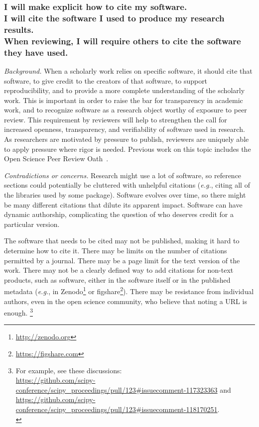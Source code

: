 \documentclass[a4paper,UKenglish]{dagman}
\renewcommand{\paragraph}[1]{\subsubsection*{#1}\xspace}
\newcommand{\eg}{\emph{e.g.},\xspace}
\begin{document}
\paragraph{I will make explicit how to cite my software.\\
I will cite the software I used to produce my research results.\\
When reviewing, I will require others to cite the software they have used.}

\emph{Background.} When a scholarly work relies on specific software, it should cite that software, to give credit to the creators of that software, to support reproducibility, and to provide a more complete understanding of the scholarly work.
This is important in order to raise the bar for transparency in academic work, and to recognize software as a research object worthy of exposure to peer review. This requirement by reviewers will help to strengthen the call for increased openness, transparency, and verifiability of software used in research. As researchers are motivated by pressure to publish, reviewers are uniquely able to apply pressure where rigor is needed. Previous work on this topic includes the Open Science Peer Review Oath~\cite{aleksic_open_2015}.

\emph{Contradictions or concerns.}
Research might use a lot of software, so reference sections could potentially be cluttered with unhelpful citations (\eg citing all of the libraries used by some package).
Software evolves over time, so there might be many different citations that dilute its apparent impact.
Software can have dynamic authorship, complicating the question of who deserves credit for a particular version.

The software that needs to be cited may not be published, making it hard to determine how to cite it.  There may be limits on the number of citations permitted by a journal.  There may be a page limit for the text version of the work.  There may not be a clearly defined way to add citations for non-text products, such as software, either in the software itself or in the published metadata (\eg in Zenodo\footnote{\url{http://zenodo.org}} or figshare\footnote{\url{https://figshare.com}}).
There may be resistance from individual authors, even in the open science community, who believe that noting a URL is enough.%
\footnote{For example, see these discussions:\\
\url{https://github.com/scipy-conference/scipy_proceedings/pull/123\#issuecomment-117323363} and\\
\url{https://github.com/scipy-conference/scipy_proceedings/pull/123\#issuecomment-118170251}.\\
}
\end{document}
